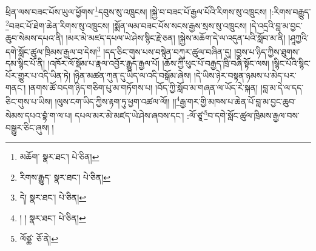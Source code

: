 ཕྲིན་ལས་བཟང་པོས་ཡུལ་ཕྱོགས་\footnote{མཆོག་  སྣར་ཐང་།  པེ་ཅིན། }དབུས་སུ་འཁྲུངས། །སྐྱེ་བ་བཟང་པོ་རྒྱལ་པོའི་རིགས་སུ་འཁྲུངས། །:རིགས་བརྒྱུད་\footnote{རིགས་རྒྱུད་  སྣར་ཐང་།  པེ་ཅིན། }བཟང་པོ་ཐེག་ཆེན་རིགས་སུ་འཁྲུངས། །སྨོན་ལམ་བཟང་པོས་སངས་རྒྱས་སྲས་སུ་འཁྲུངས། །དེ་འདྲའི་བླ་མ་བྱང་ཆུབ་སེམས་དཔའ་ནི། །མར་མེ་མཛད་དཔལ་ཡེ་ཤེས་སྙིང་རྗེ་ཅན། །སྐྱེས་མཆོག་དེ་ལ་འདུན་པའི་སློབ་མ་ནི། །ཤཱཀྱའི་དགེ་སློང་ཚུལ་ཁྲིམས་རྒྱལ་བ་དེས།\footnote{དེ།  སྣར་ཐང་།  པེ་ཅིན། } །དད་ཅིང་གུས་པས་བསྙེན་བཀུར་ཚུལ་བཞིན་དུ། །བྱས་པ་ཉིད་ཀྱིས་ཐུགས་དམ་སྙིང་པོ་ནི། །འཁོར་ལོ་སྡོམ་པ་རྣལ་འབྱོར་རྒྱུད་རྒྱལ་པོ། །ཆོས་ཀྱི་ཕུང་པོ་བརྒྱད་ཁྲི་བཞི་སྟོང་ལས། །སྙིང་པོའི་སྙིང་པོར་གྱུར་པ་འདི་ཡིན་ཏེ། །ཉིན་མཚན་ཀུན་དུ་ཡིད་ལ་འདི་བསྒོམ་ཞེས། །དེ་ཡིས་ཉེར་བསྟན་ཉམས་པ་མེད་པར་གནང་། །ནགས་ཚོ་བདག་ཉིད་གཅིག་པུ་མ་གཏོགས་པ། །བོད་ཀྱི་སློབ་མ་གཞན་ལ་ཡོད་རེ་སྐན། །བླ་མ་དེ་ལ་དད་ཅིང་གུས་པ་ཡིས། །ལུས་ངག་ཡིད་ཀྱིས་རྟག་ཏུ་ཕྱག་འཚལ་ལོ།། །།\footnote{། །  སྣར་ཐང་།  པེ་ཅིན། }རྒྱ་གར་གྱི་མཁས་པ་ཆེན་པོ་བླ་མ་བྱང་ཆུབ་སེམས་དཔའ་བྷཾ་ག་ལ་པ། དཔལ་མར་མེ་མཛད་ཡེ་ཤེས་ཞབས་དང་། :ལོ་ཙཱ་\footnote{ལོཙྪ་  ཅོ་ནེ། }བ་དགེ་སློང་ཚུལ་ཁྲིམས་རྒྱལ་བས་བསྒྱུར་ཅིང་ཞུས། ། 